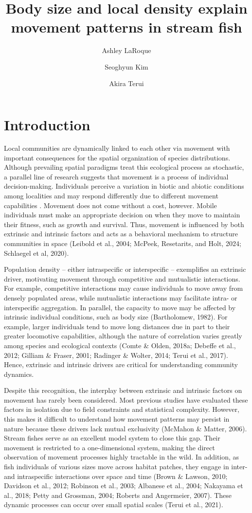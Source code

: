 \documentclass[11pt, class=article, crop=false]{standalone}
\title{Body size and local density explain movement patterns in stream fish}
\date{} %
\author[1]{Ashley LaRoque}
\author[2]{Seoghyun Kim}
\author[1]{Akira Terui}
\affil[1]{Depatment of Biology, University of North Carolina at Greensboro}
\affil[2]{XXX}
\begin{document}
\maketitle

\section{Introduction}

Local communities are dynamically linked to each other via movement with important consequences for the spatial organization of species distributions. Although prevailing spatial paradigms treat this ecological process as stochastic, a parallel line of research suggests that movement is a process of individual decision-making. Individuals perceive a variation in biotic and abiotic conditions among localities and may respond differently due to different movement capabilities \citep{tesfaygebrekirosFactorsAffectingStream2016}. Movement does not come without a cost, however. Mobile individuals must make an appropriate decision on when they move to maintain their fitness, such as growth and survival. Thus, movement is influenced by both extrinsic and intrinsic factors and acts as a behavioral mechanism to structure communities in space (Leibold et al., 2004; McPeek, Resetarits, and Holt, 2024; Schlaegel et al, 2020). 

Population density – either intraspecific or interspecific – exemplifies an extrinsic driver, motivating movement through competitive and mutualistic interactions. For example, competitive interactions may cause individuals to move away from densely populated areas, while mutualistic interactions may facilitate intra- or interspecific aggregation. In parallel, the capacity to move may be affected by intrinsic individual conditions, such as body size (Bartholomew, 1982). For example,  larger individuals tend to move long distances due in part to their greater locomotive capabilities, although the nature of correlation varies greatly among species and ecological contexts  (Comte \& Olden, 2018a; Debeffe et al., 2012; Gilliam \& Fraser, 2001; Radinger \& Wolter, 2014; Terui et al., 2017). Hence, extrinsic and intrinsic drivers are critical for understanding community dynamics.

Despite this recognition, the interplay between extrinsic and intrinsic factors on movement has rarely been considered. Most previous studies have evaluated these factors in isolation due to field constraints and statistical complexity. However, this makes it difficult to understand how movement patterns may persist in nature because these drivers lack mutual exclusivity (McMahon \& Matter, 2006). Stream fishes serve as an excellent model system to close this gap. Their movement is restricted to a one-dimensional system, making the direct observation of movement processes highly tractable in the wild. In addition, as fish individuals of various sizes move across habitat patches, they engage in inter- and intraspecific interactions over space and time (Brown \& Lawson, 2010; Davidson et al., 2012; Robinson et al., 2003; Albanese et al., 2004; Nakayama et al., 2018; Petty and Grossman, 2004; Roberts and Angermeier, 2007). These dynamic processes can occur over small spatial scales (Terui et al., 2021). 
\end{document}
